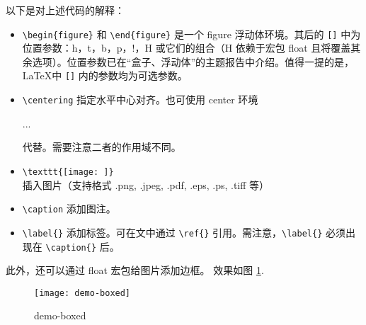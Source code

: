 以下是对上述代码的解释：
\begin{itemize}
  \item \verb+\begin{figure}+ 和 \verb+\end{figure}+ 是一个 figure 浮动体环境。其后的 \verb+[]+ 中为位置参数：h，t，b，p，!，H 或它们的组合（H 依赖于宏包 float 且将覆盖其余选项）。位置参数已在“盒子、浮动体”的主题报告中介绍。值得一提的是，\LaTeX 中 \verb+[]+ 内的参数均为可选参数。
  \item \verb+\centering+ 指定水平中心对齐。也可使用 center 环境 \\
\begin{texlst}[numbers=none]
\begin{center}
...
\end{center}
\end{texlst}
    代替。需要注意二者的作用域不同。
  \item \verb+\texttt{[image: ]}+ 插入图片（支持格式 .png, .jpeg, .pdf, .eps, .ps, .tiff 等）
  \item \verb+\caption+ 添加图注。
  \item \verb+\label{}+ 添加标签。可在文中通过 \verb+\ref{}+ 引用。需注意，\verb+\label{}+ 必须出现在 \verb+\caption{}+ 后。
\end{itemize}

此外，还可以通过 float 宏包给图片添加边框。
效果如图 \ref{demo-boxed}.
\begin{figure}[]
  \centering
  \texttt{[image: demo-boxed]}
  \caption{demo-boxed}
  \label{demo-boxed}
\end{figure}